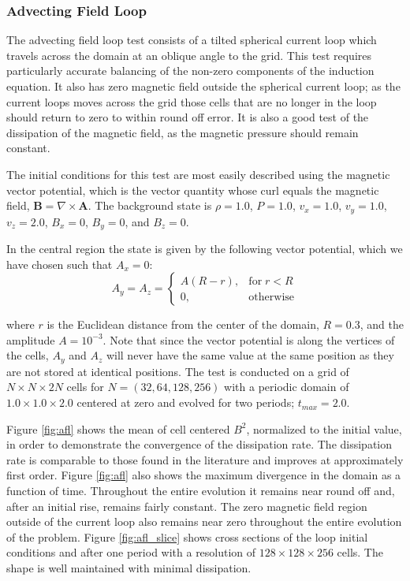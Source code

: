 \documentclass[modern, linenumbers]{aastex631}
\begin{document}
\subsubsection{Advecting Field Loop}
\label{sec:afl}

The advecting field loop test consists of a tilted spherical current loop which travels across the domain at an oblique angle to the grid. This test requires particularly accurate balancing of the non-zero components of the induction equation. It also has zero magnetic field outside the spherical current loop; as the current loops moves across the grid those cells that are no longer in the loop should return to zero to within round off error. It is also a good test of the dissipation of the magnetic field, as the magnetic pressure should remain constant.

The initial conditions for this test are most easily described using the magnetic vector potential, which is the vector quantity whose curl equals the magnetic field, $\boldsymbol{B} = \nabla \times\boldsymbol{A}$. The background state is
$\rho = 1.0$,
$P = 1.0$,
$v_x = 1.0$,
$v_y = 1.0$,
$v_z = 2.0$,
$B_x = 0$,
$B_y = 0$, and
$B_z = 0$.

In the central region the state is given by the following vector potential, which we have chosen such that $A_x = 0$:
\begin{equation}
    A_y = A_z =
    \begin{cases}
        A \left( R - r \right),& \text{for}\; r < R\\
        0,              & \text{otherwise}
    \end{cases}
\end{equation}

\noindent where $r$ is the Euclidean distance from the center of the domain, $R = 0.3$, and the amplitude $A=10^{-3}$. Note that since the vector potential is along the vertices of the cells, $A_y$ and $A_z$ will never have the same value at the same position as they are not stored at identical positions. The test is conducted on a grid of $N\times N\times 2N$ cells for $N=(32, 64, 128, 256)$ with a periodic domain of $1.0\times1.0\times2.0$ centered at zero and evolved for two periods; $t_{max} = 2.0$.

Figure \ref{fig:afl} shows the mean of cell centered $B^2$, normalized to the initial value, in order to demonstrate the convergence of the dissipation rate. The dissipation rate is comparable to those found in the literature \citep{stone_athena_2008} and improves at approximately first order. Figure \ref{fig:afl} also shows the maximum divergence in the domain as a function of time. Throughout the entire evolution it remains near round off and, after an initial rise, remains fairly constant. The zero magnetic field region outside of the current loop also remains near zero throughout the entire evolution of the problem. Figure \ref{fig:afl_slice} shows cross sections of the loop initial conditions and after one period with a resolution of $128\times128\times256$ cells. The shape is well maintained with minimal dissipation.
\end{document}

